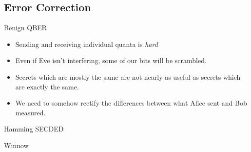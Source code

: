 \documentclass[pdf]{beamer}
\begin{document}
\subsection{Error Correction}
\begin{frame}{Benign QBER}
  \begin{itemize}
  \item Sending and receiving individual quanta is \emph{hard}
  \item Even if Eve isn't interfering, some of our bits will be scrambled.
  \item Secrets which are mostly the same are not nearly as useful as secrets which are
    exactly the same.
  \item We need to somehow rectify the differences between what Alice sent and
    Bob measured.
  \end{itemize}
\end{frame}

\begin{frame}{Hamming SECDED}

\end{frame}

\begin{frame}{Winnow}

\end{frame}
\end{document}
